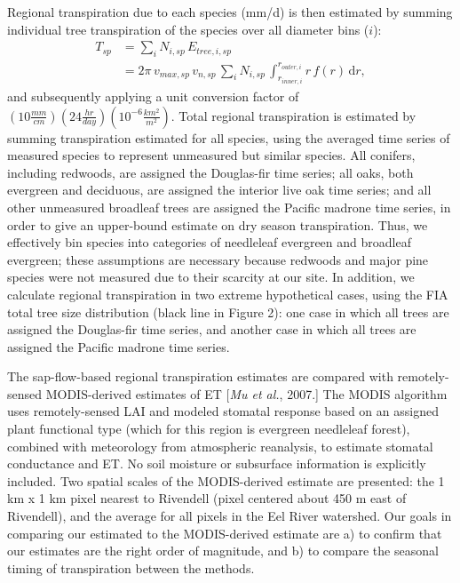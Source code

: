 Regional transpiration due to each species (mm/d) is then estimated by summing individual tree transpiration of the species over all diameter bins ($i$):
\begin{align}
T_{sp} &= \sum_{i} N_{i,sp} \, E_{tree,i,sp} \nonumber \\
&= 2\pi \, v_{max,sp} \, v_{n,sp} \, \sum_{i} N_{i,sp} \, \int_{r_{inner,i}}^{r_{outer,i}}  r \, f(r) \, \mathrm{d}r ,
\end{align}
and subsequently applying a unit conversion factor of $(10 \tfrac{mm}{cm}) (24 \tfrac{hr}{day}) (10^{-6} \tfrac{km^2}{m^2})$.  Total regional transpiration is estimated by summing transpiration estimated for all species, using the averaged time series of measured species to represent unmeasured but similar species.  All conifers, including redwoods, are assigned the Douglas-fir time series; all oaks, both evergreen and deciduous, are assigned the interior live oak time series; and all other unmeasured broadleaf trees are assigned the Pacific madrone time series, in order to give an upper-bound estimate on dry season transpiration.  Thus, we effectively bin species into categories of needleleaf evergreen and broadleaf evergreen; these assumptions are necessary because redwoods and major pine species were not measured due to their scarcity at our site.  In addition, we calculate regional transpiration in two extreme hypothetical cases, using the FIA total tree size distribution (black line in Figure 2): one case in which all trees are assigned the Douglas-fir time series, and another case in which all trees are assigned the Pacific madrone time series. 

The sap-flow-based regional transpiration estimates are compared with remotely-sensed MODIS-derived estimates of ET [\textit{Mu et al.}, 2007.]  The MODIS algorithm uses remotely-sensed LAI and modeled stomatal response based on an assigned plant functional type (which for this region is evergreen needleleaf forest), combined with meteorology from atmospheric reanalysis, to estimate stomatal conductance and ET.  No soil moisture or subsurface information is explicitly included.  Two spatial scales of the MODIS-derived estimate are presented: the 1 km x 1 km pixel nearest to Rivendell (pixel centered about 450 m east of Rivendell), and the average for all pixels in the Eel River watershed.  Our goals in comparing our estimated to the MODIS-derived estimate are a) to confirm that our estimates are the right order of magnitude, and b) to compare the seasonal timing of transpiration between the methods.

